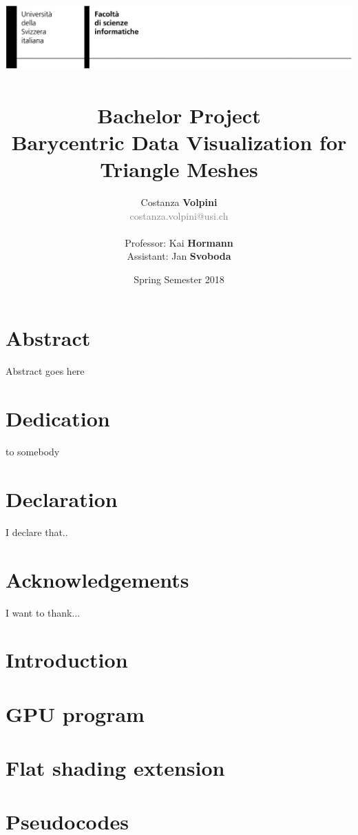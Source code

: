 \documentclass[12pt]{report}
\title{ \includegraphics[width=\linewidth]{header.png}~
\\[0.5cm]
  \huge{Bachelor Project} \\
\textbf{\Large{Barycentric Data Visualization for Triangle Meshes}}}
\date{Spring Semester 2018}
\author{Costanza \textbf{Volpini} \\ \textcolor{gray}{costanza.volpini@usi.ch} \\ \\ Professor: Kai \textbf{Hormann} \\ Assistant: Jan \textbf{Svoboda}}
\begin{document}
\pagestyle{fancy}
\maketitle
{}

\chapter*{Abstract}
Abstract goes here

\chapter*{Dedication}
to somebody

\chapter*{Declaration}
I declare that..

\chapter*{Acknowledgements}
I want to thank...

\tableofcontents
\chapter{Introduction}


\chapter{GPU program}


\chapter{Flat shading extension}



% 
\printbibliography


\appendix
\chapter{Pseudocodes}

\end{document}
